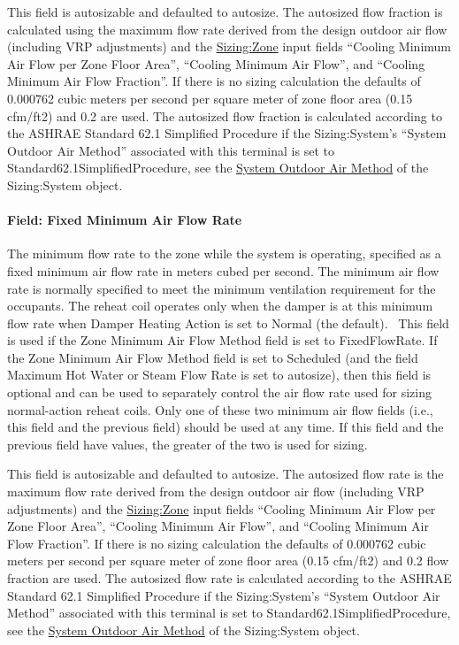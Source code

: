 This field is autosizable and defaulted to autosize. The autosized flow fraction is calculated using the maximum flow rate derived from the design outdoor air flow (including VRP adjustments) and the \hyperref[sizingzone]{Sizing:Zone} input fields ``Cooling Minimum Air Flow per Zone Floor Area'', ``Cooling Minimum Air Flow'', and ``Cooling Minimum Air Flow Fraction''. If there is no sizing calculation the defaults of 0.000762 cubic meters per second per square meter of zone floor area (0.15 cfm/ft2) and 0.2 are used. The autosized flow fraction is calculated according to the ASHRAE Standard 62.1 Simplified Procedure if the Sizing:System's ``System Outdoor Air Method'' associated with this terminal is set to Standard62.1SimplifiedProcedure, see the \hyperref[field-system-outdoor-air-method]{System Outdoor Air Method} of the Sizing:System object.

\paragraph{Field: Fixed Minimum Air Flow Rate}\label{field-fixed-minimum-air-flow-rate}

The minimum flow rate to the zone while the system is operating, specified as a fixed minimum air flow rate in meters cubed per second. The minimum air flow rate is normally specified to meet the minimum ventilation requirement for the occupants. The reheat coil operates only when the damper is at this minimum flow rate when Damper Heating Action is set to Normal (the default).~ This field is used if the Zone Minimum Air Flow Method field is set to FixedFlowRate. If the Zone Minimum Air Flow Method field is set to Scheduled (and the field Maximum Hot Water or Steam Flow Rate is set to autosize), then this field is optional and can be used to separately control the air flow rate used for sizing normal-action reheat coils. Only one of these two minimum air flow fields (i.e., this field and the previous field) should be used at any time. If this field and the previous field have values, the greater of the two is used for sizing.

This field is autosizable and defaulted to autosize. The autosized flow rate is the maximum flow rate derived from the design outdoor air flow (including VRP adjustments) and the \hyperref[sizingzone]{Sizing:Zone} input fields ``Cooling Minimum Air Flow per Zone Floor Area'', ``Cooling Minimum Air Flow'', and ``Cooling Minimum Air Flow Fraction''. If there is no sizing calculation the defaults of 0.000762 cubic meters per second per square meter of zone floor area (0.15 cfm/ft2) and 0.2 flow fraction are used. The autosized flow rate is calculated according to the ASHRAE Standard 62.1 Simplified Procedure if the Sizing:System's ``System Outdoor Air Method'' associated with this terminal is set to Standard62.1SimplifiedProcedure, see the \hyperref[field-system-outdoor-air-method]{System Outdoor Air Method} of the Sizing:System object.

